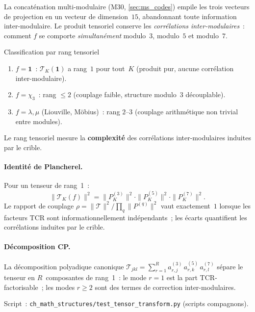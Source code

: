 \documentclass[12pt,a4paper]{article}
\begin{document}
La concaténation multi-modulaire (M30, \cref{sec:ms_codes}) empile les
trois vecteurs de projection en un vecteur de dimension~$15$,
abandonnant toute information inter-modulaire. Le produit tensoriel
conserve les \emph{corrélations inter-modulaires}~: comment $f$ se
comporte \emph{simultanément} modulo~$3$, modulo~$5$ et modulo~$7$.

\begin{thmbox}{Classification par rang tensoriel}
\label{thm:tensor_rank}
\begin{enumerate}[nosep]
\item $f = \mathbf{1}$~: $\mathcal{T}_K(\mathbf{1})$ a rang~$1$ pour
  tout~$K$ (produit pur, aucune corrélation inter-modulaire).
\item $f = \chi_3$~: rang $\leq 2$ (couplage faible, structure modulo~3
  découplable).
\item $f = \lambda, \mu$ (Liouville, Möbius)~: rang $2$--$3$
  (couplage arithmétique non trivial entre modules).
\end{enumerate}
Le rang tensoriel mesure la \textbf{complexité} des corrélations
inter-modulaires induites par le crible.
\end{thmbox}

\paragraph{Identité de Plancherel.}
Pour un tenseur de rang~1~:
\begin{equation}
  \|\mathcal{T}_K(f)\|^2
  = \|P_K^{(3)}\|^2 \cdot \|P_K^{(5)}\|^2 \cdot \|P_K^{(7)}\|^2.
  \label{eq:plancherel_tensor}
\end{equation}
Le rapport de couplage $\rho = \|\mathcal{T}\|^2 / \prod_q
\|P^{(q)}\|^2$ vaut exactement~$1$ lorsque les facteurs TCR sont
informationnellement indépendants~; les écarts quantifient les
corrélations induites par le crible.

\paragraph{Décomposition CP.}
La décomposition polyadique canonique
$\mathcal{T}_{jkl} = \sum_{r=1}^{R} a_{r,j}^{(3)} \, a_{r,k}^{(5)} \,
a_{r,l}^{(7)}$
sépare le tenseur en $R$~composantes de rang~1~: le mode $r = 1$ est
la part TCR-factorisable~; les modes $r \geq 2$ sont des termes de
correction inter-modulaires.

Script~: \texttt{ch\_math\_structures/test\_tensor\_transform.py}
(scripts compagnons).
\end{document}
